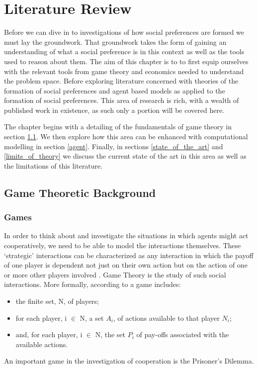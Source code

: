 \documentclass[11pt]{book}
\newcommand*{\np}{\par\noindent\newline}
\begin{document}
\chapter{Literature Review}\label{lit_review}
Before we can dive in to investigations of how social preferences are formed we must lay the groundwork.
That groundwork takes the form of gaining an understanding of what a social preference is in this context as well as the tools used to reason about them.
The aim of this chapter is to to first equip ourselves with the relevant tools from game theory and economics needed to understand the problem space.
Before exploring literature concerned with theories of the formation of social preferences and agent based models as applied to the formation of social preferences. 
This area of research is rich, with a wealth of published work in existence, as such only a portion will be covered here.

\np The chapter begins with a detailing of the fundamentals of game theory in section \ref{game_theoretic_background}.
We then explore how this area can be enhanced with computational modelling in section \ref{agent}.
Finally, in sections \ref{state_of_the_art} and \ref{limits_of_theory} we discuss the current state of the art in this area as well as the limitations of this literature.

\section{Game Theoretic Background}\label{game_theoretic_background}
\subsection{Games}\label{games}
In order to think about and investigate the situations in which agents might act cooperatively, we need to be able to
model the interactions themselves. These `strategic' interactions can be characterized as any interaction in which the
payoff of one player is dependent not just on their own action but on the action of one or more other players involved \citep{angner_course_2012}. Game Theory is the study of such social interactions. More formally, according to
\citet{osborne_course_1994} a game includes:
\begin{itemize}
	\item the finite set, N, of players;
	\item for each player, i $\in$ N, a set $A_i$, of actions available to that
	player $N_i$;
	\item and, for each player, i $\in$ N, the set $P_i$ of pay-offs associated
	with the available actions.
\end{itemize}
An important game in the investigation of cooperation is the Prisoner's Dilemma. 
\end{document}
